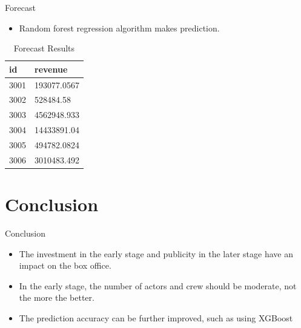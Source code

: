 \documentclass[
 size=14pt,
 paper=smartboard,  %
 mode=present, 		%
 display=slides, 	%
 style=tuliplab,  	%
 pauseslide,
 fleqn,leqno]{powerdot}
\begin{document}
\begin{slide}{Forecast}

\begin{itemize}
\item Random forest regression algorithm makes prediction.
\end{itemize}

\begin{table}
\centering
\caption{Forecast Results}

\begin{tabular}{p{65pt} | p{110pt}}
\toprule
  id & revenue\\
\hline
  3001 & 193077.0567 \\
  3002 & 528484.58  \\
  3003 & 4562948.933  \\
  3004 &  14433891.04 \\
  3005 &  494782.0824  \\
  3006 &  3010483.492  \\
\bottomrule

\end{tabular}
\end{table}

\end{slide}




\section{Conclusion}

\begin{slide}[toc=,bm=]{Conclusion}
\begin{itemize}
\item The investment in the early stage and publicity in the later stage have an impact on the box office.
\smallskip

\item
\smallskip
In the early stage, the number of actors and crew should be moderate, not the more the better.

\item
\smallskip
The prediction accuracy can be further improved, such as using XGBoost
\end{itemize}

\end{slide}
\end{document}

